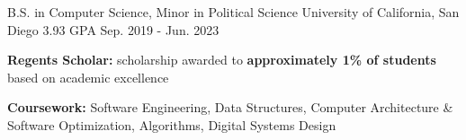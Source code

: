 

\begin{cventries}

    \cventry
    {B.S. in Computer Science, Minor in Political Science} %
    {University of California, San Diego} %
    {3.93 GPA} %
    {Sep. 2019 - Jun. 2023} %
    {
      \begin{cvitems} %
        \item {\textbf{Regents Scholar:} scholarship awarded to \textbf{approximately 1\% of students} based on academic excellence}
        \item {\textbf{Coursework:} Software Engineering, Data Structures, Computer Architecture \& Software Optimization, Algorithms, Digital Systems Design}
      \end{cvitems}
    }

\end{cventries}
